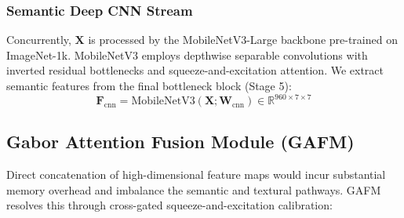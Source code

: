 \subsubsection{Semantic Deep CNN Stream}
Concurrently, $\mathbf{X}$ is processed by the MobileNetV3-Large backbone pre-trained on ImageNet-1k. MobileNetV3 employs depthwise separable convolutions with inverted residual bottlenecks and squeeze-and-excitation attention. We extract semantic features from the final bottleneck block (Stage 5):
\begin{equation}
    \mathbf{F}_{\text{cnn}} = \text{MobileNetV3}(\mathbf{X}; \mathbf{W}_{\text{cnn}}) \in \mathbb{R}^{960 \times 7 \times 7}
\end{equation}

\subsection{Gabor Attention Fusion Module (GAFM)}
Direct concatenation of high-dimensional feature maps would incur substantial memory overhead and imbalance the semantic and textural pathways. GAFM resolves this through cross-gated squeeze-and-excitation calibration:
